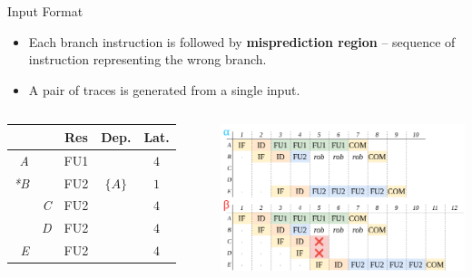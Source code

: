 \documentclass{beamer}
\begin{document}
\begin{frame}{Input Format}

\begin{itemize}
    \item Each branch instruction is followed by \textbf{misprediction region} -- sequence of instruction representing the wrong branch.
    \item A pair of traces is generated from a single input.
\end{itemize}

\begin{columns}
        \begin{tabular}{rr|ccc}
         &  & Res & Dep. & Lat. \\ \hline
        \textit{A} &  & FU1 &  & $4$ \\
        \textit{*B} &  & FU2 & $\{A\}$ & $1$ \\
        & \textit{C} & FU2 &  & $4$ \\
        & \textit{D} & FU2 &  & $4$ \\
        \textit{E} &  & FU2 &  & $4$ \\
        \end{tabular}

        \includegraphics[width=\textwidth]{pic/mispred-intro.png}
\end{columns}

\end{frame}
\end{document}
